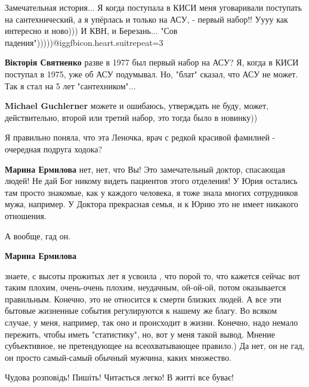\begin{itemize}
Замечательная история...
Я когда поступала в КИСИ меня уговаривали поступать на сантехнический, а я упёрлась и только на АСУ, - первый набор!! Уууу как интересно и ново)))
И КВН, и Березань...
"Сов падения")))))@igg{fbicon.heart.suit}{repeat=3}

\begin{itemize} %
\textbf{Вікторія Святненко} разве в 1977 был первый набор на АСУ?
Я, когда в КИСИ поступал в 1975, уже об АСУ подумывал. Но, "блат" сказал, что АСУ не может. Так я стал на 5 лет "сантехником"...

\textbf{Michael Guchlerner} можете и ошибаюсь, утверждать не буду, может, действительно, второй или третий набор, это тогда было в новинку))
\end{itemize} %


Я правильно поняла, что эта Леночка, врач с редкой красивой фамилией -
очередная подруга ходока?

\begin{itemize} %
\textbf{Марина Ермилова} нет, нет, что Вы! Это замечательный доктор, спасающая людей! Не дай Бог никому видеть пациентов этого отделения! У Юрия остались там просто знакомые, как у каждого человека, я тоже знала многих сотрудников мужа, например. У Доктора прекрасная семья, и к Юрию это не имеет никакого отношения.
\end{itemize} %

А вообще, гад он.

\begin{itemize} %
\textbf{Марина Ермилова} 

знаете, с высоты прожитых лет я усвоила , что порой то, что кажется сейчас вот
таким плохим, очень-очень плохим, неудачным, ой-ой-ой, потом оказывается
правильным. Конечно, это не относится к смерти близких людей. А все эти бытовые
жизненные события регулируются к нашему же благу. Во всяком случае, у меня,
например, так оно и происходит в жизни. Конечно, надо немало пережить, чтобы
иметь "статистику", но, вот у меня такой вывод. Мнение субъективное, не
претендующее на всеохватывающее правило.) Да нет, он не гад, он просто
самый-самый обычный мужчина, каких множество.

\end{itemize} %

Чудова розповідь! Пишіть! Читається легко! В житті все буває!


\end{itemize}

